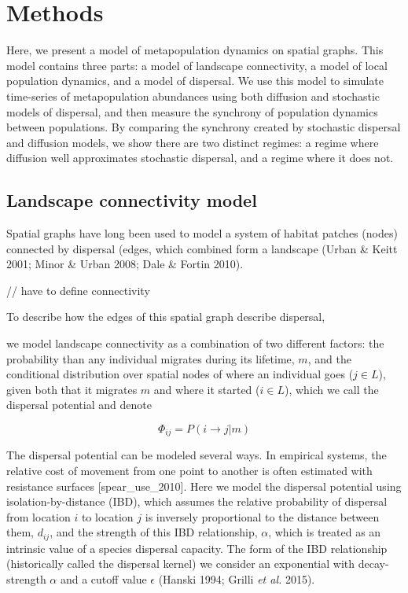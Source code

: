 \documentclass[11pt]{article}
\begin{document}
\hypertarget{methods}{%
\section{Methods}\label{methods}}

Here, we present a model of metapopulation dynamics on spatial graphs.
This model contains three parts: a model of landscape connectivity, a
model of local population dynamics, and a model of dispersal. We use
this model to simulate time-series of metapopulation abundances using
both diffusion and stochastic models of dispersal, and then measure the
synchrony of population dynamics between populations. By comparing the
synchrony created by stochastic dispersal and diffusion models, we show
there are two distinct regimes: a regime where diffusion well
approximates stochastic dispersal, and a regime where it does not.

\hypertarget{landscape-connectivity-model}{%
\subsection{Landscape connectivity
model}\label{landscape-connectivity-model}}

Spatial graphs have long been used to model a system of habitat patches
(nodes) connected by dispersal (edges, which combined form a landscape
(Urban \& Keitt 2001; Minor \& Urban 2008; Dale \& Fortin 2010).

// have to define connectivity

To describe how the edges of this spatial graph describe dispersal,

we model landscape connectivity as a combination of two different
factors: the probability than any individual migrates during its
lifetime, \(m\), and the conditional distribution over spatial nodes of
where an individual goes (\(j \in L\)), given both that it migrates
\(m\) and where it started (\(i \in L\)), which we call the dispersal
potential and denote

\[\Phi_{ij} =  P(i \to j | m)\]

The dispersal potential can be modeled several ways. In empirical
systems, the relative cost of movement from one point to another is
often estimated with resistance surfaces {[}spear\_use\_2010{]}. Here we
model the dispersal potential using isolation-by-distance (IBD), which
assumes the relative probability of dispersal from location \(i\) to
location \(j\) is inversely proportional to the distance between them,
\(d_{ij}\), and the strength of this IBD relationship, \(\alpha\), which
is treated as an intrinsic value of a species dispersal capacity. The
form of the IBD relationship (historically called the dispersal kernel)
we consider an exponential with decay-strength \(\alpha\) and a cutoff
value \(\epsilon\) (Hanski 1994; Grilli \emph{et al.} 2015).
\end{document}
